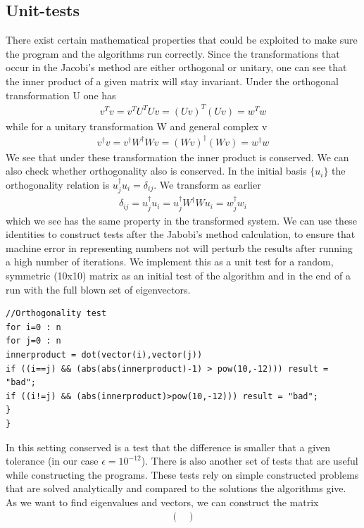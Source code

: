 \documentclass[a4paper,11pt]{article}
\begin{document}
{\subsection{Unit-tests}
There exist certain mathematical properties that could be exploited to make sure the program and the algorithms run correctly. Since the transformations that occur in the Jacobi's method are either orthogonal or unitary, one can see that the inner product of a given matrix will stay invariant. Under the orthogonal transformation U one has
\begin{align}
v^{T}v = v^T U^T U v = (Uv)^T (Uv) = w^T w
\end{align}
while for a unitary transformation W and general complex v
\begin{align}
v^\dagger v = v^\dagger W^\dagger W v = (Wv)^\dagger (Wv) = w^\dagger w
\end{align}
We see that under these transformation the inner product is conserved. We can also check whether orthogonality also is conserved. In the initial basis $\{u_i\}$ the orthogonality relation is $u_j^\dagger u_i = \delta_{ij}$. We transform as earlier
\begin{align}
\delta_{ij}=u_j^\dagger u_i = u_j^\dagger W^\dagger W u_i = w_j^\dagger w_i
\end{align}
which we see has the same property in the transformed system. We can use these identities to construct tests after the Jabobi's method calculation, to ensure that machine error in representing numbers not will perturb the results after running a high number of iterations. We implement this as a unit test for a random, symmetric (10x10) matrix as an initial test of the algorithm and in the end of a run with the full blown set of eigenvectors. 
\begin{lstlisting}
//Orthogonality test   
for i=0 : n
for j=0 : n
innerproduct = dot(vector(i),vector(j))
if ((i==j) && (abs(abs(innerproduct)-1) > pow(10,-12))) result = "bad";
if ((i!=j) && (abs(innerproduct)>pow(10,-12))) result = "bad";
}
}
\end{lstlisting}
In this setting conserved is a test that the difference is smaller that a given tolerance (in our case $\epsilon = 10^{-12}$). There is also another set of tests that are useful while constructing the programs. These tests rely on simple constructed problems that are solved analytically and compared to the solutions the algorithms give. As we want to find eigenvalues and vectors, we can construct the matrix 
\begin{align}
\begin{pmatrix}

\end{pmatrix}
\end{align}}
\end{document}
